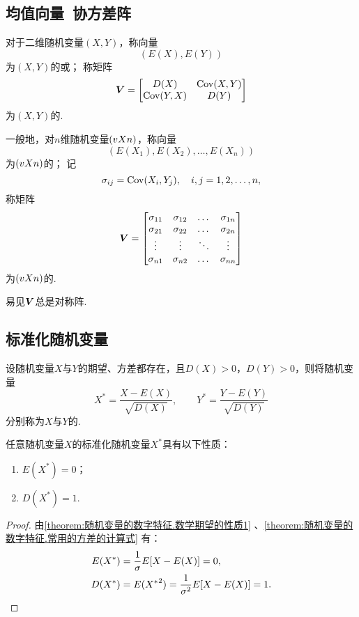 \subsection{均值向量\ 协方差阵}
\begin{definition}
对于二维随机变量\((X,Y)\)，称向量\[
(E(X),E(Y))
\]为\((X,Y)\)的或；
称矩阵\[
\boldsymbol{V} = \begin{bmatrix}
D(X) & \operatorname{Cov}(X,Y) \\
\operatorname{Cov}(Y,X) & D(Y)
\end{bmatrix}
\]为\((X,Y)\)的.

一般地，对\(n\)维随机变量\((v{X}{n})\)，称向量\[
(E(X_1),E(X_2),\dotsc,E(X_n))
\]为\((v{X}{n})\)的；
记\[
\sigma_{ij} = \operatorname{Cov}(X_i,Y_j),
\quad i,j=1,2,\dotsc,n,
\]称矩阵\[
\boldsymbol{V} = \begin{bmatrix}
\sigma_{11} & \sigma_{12} & \dots & \sigma_{1n} \\
\sigma_{21} & \sigma_{22} & \dots & \sigma_{2n} \\
\vdots & \vdots & \ddots & \vdots \\
\sigma_{n1} & \sigma_{n2} & \dots & \sigma_{nn}
\end{bmatrix}
\]为\((v{X}{n})\)的.
\end{definition}

易见\(\boldsymbol{V}\)总是对称阵.

\subsection{标准化随机变量}
\begin{definition}
设随机变量\(X\)与\(Y\)的期望、方差都存在，且\(D(X) > 0\)，\(D(Y) > 0\)，则将随机变量\[
X^* = \frac{X-E(X)}{\sqrt{D(X)}},
\qquad
Y^* = \frac{Y-E(Y)}{\sqrt{D(Y)}}
\]分别称为\(X\)与\(Y\)的.
\end{definition}

\begin{property}\label{theorem:随机变量的数字特征.标准化随机变量的数字特征}
任意随机变量\(X\)的标准化随机变量\(X^*\)具有以下性质：
\begin{enumerate}
\item \(E(X^*)=0\)；
\item \(D(X^*)=1\).
\end{enumerate}
\begin{proof}
由\cref{theorem:随机变量的数字特征.数学期望的性质1} 、\cref{theorem:随机变量的数字特征.常用的方差的计算式} 有：\begin{align*}
E(X^*) &= \frac{1}{\sigma} E[X-E(X)] = 0, \\
D(X^*) &= E({X^*}^2) = \frac{1}{\sigma^2} E[X-E(X)] = 1.
\qedhere
\end{align*}
\end{proof}
\end{property}

